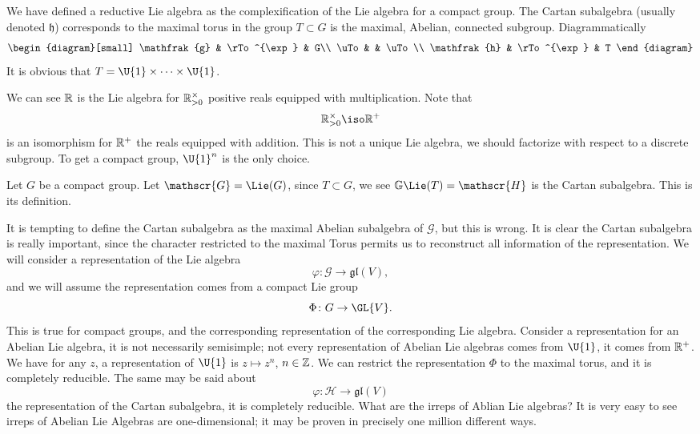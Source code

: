 We have defined a reductive Lie algebra as the complexification
of the Lie algebra for a compact group. The Cartan subalgebra
(usually denoted $\mathfrak{h}$) corresponds to the maximal torus
in the group $T\subset G$ is the maximal, Abelian, connected
subgroup. Diagrammatically 
\begin{equation}
\begin{diagram}[small]
\mathfrak{g} & \rTo^{\exp} & G\\
\uTo         &             & \uTo\\
\mathfrak{h} & \rTo^{\exp} & T
\end{diagram}
\end{equation}
It is obvious that $T=\U{1}\times\cdots\times\U{1}$.

We can see $\Bbb{R}$ is the Lie algebra for
$\Bbb{R}^{\times}_{>0}$ positive reals equipped with
multiplication. Note that
\begin{equation}
\Bbb{R}^{\times}_{>0}\iso\Bbb{R}^{+}
\end{equation}
is an isomorphism for $\Bbb{R}^{+}$ the reals equipped with
addition. This is not a unique Lie algebra, we should factorize
with respect to a discrete subgroup. To get a compact group,
$\U{1}^{n}$ is the only choice.

Let $G$ be a compact group. Let $\mathscr{G}=\Lie(G)$, since
$T\subset G$, we see $\mathbb{G}\Lie(T)=\mathscr{H}$ is the
Cartan subalgebra. This is its definition.

It is tempting to define the Cartan subalgebra as the maximal
Abelian subalgebra of $\mathscr{G}$, but this is wrong. It is
clear the Cartan subalgebra is really important, since the
character restricted to the maximal Torus permits us to
reconstruct all information of the representation. We will
consider a representation of the Lie algebra
\begin{equation}
\varphi\colon\mathscr{G}\to\mathfrak{gl}(V),
\end{equation}
and we will assume the representation comes from a compact Lie
group
\begin{equation}
\Phi\colon G\to\GL{V}.
\end{equation}
This is true for compact groups, and the corresponding
representation of the corresponding Lie algebra. Consider a
representation for an Abelian Lie algebra, it is not necessarily
semisimple; not every representation of Abelian Lie algebras
comes from $\U{1}$, it comes from $\Bbb{R}^{+}$. We have for any
$z$, a representation of $\U{1}$ is $z\mapsto z^{n}$,
$n\in\Bbb{Z}$. We can restrict the representation $\Phi$ to the
maximal torus, and it is completely reducible. The same may be
said about
\begin{equation}
\varphi\colon\mathscr{H}\to\mathfrak{gl}(V)
\end{equation}
the representation of the Cartan subalgebra, it is completely
reducible. What are the irreps of Ablian Lie algebras? It is very
easy to see irreps of Abelian Lie Algebras are one-dimensional;
it may be proven in precisely one million different ways.


